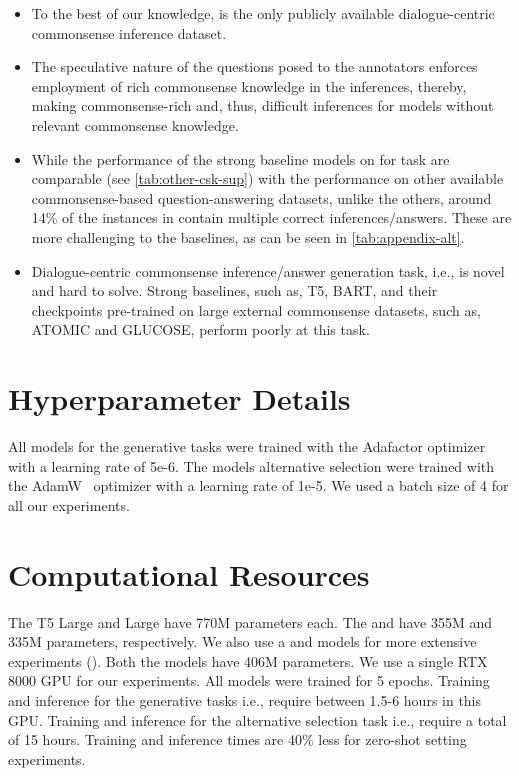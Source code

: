 \begin{itemize}
    \item To the best of our knowledge, \dataset{} is the only publicly available dialogue-centric commonsense inference dataset.
    \item The speculative nature of the questions posed to the annotators enforces employment of rich commonsense knowledge in the inferences, thereby, making \dataset{} commonsense-rich and, thus, difficult inferences for models without relevant commonsense knowledge.
    \item While the performance of the strong baseline models on \dataset{} for \dataset{} task are comparable (see \cref{tab:other-csk-sup}) with the performance on other available commonsense-based question-answering datasets, unlike the others, around 14\% of the instances in \dataset{} contain multiple correct inferences/answers. These are more challenging to the baselines, as can be seen in \cref{tab:appendix-alt}.
    \item Dialogue-centric commonsense inference/answer generation task, i.e., \dataset{} is novel and hard to solve. Strong baselines, such as, T5, BART, and their checkpoints pre-trained on large external commonsense datasets, such as, ATOMIC and GLUCOSE, perform poorly at this task.
\end{itemize}

\section{Hyperparameter Details}
All models for the \dataset{} generative tasks were trained with the Adafactor optimizer~\cite{shazeer2018adafactor} with a learning rate of 5e-6. The models  \dataset{} alternative selection were trained with the AdamW~\cite{loshchilov2018decoupled} optimizer with a learning rate of 1e-5. We used a batch size of 4 for all our experiments.

\section{Computational Resources}
The T5 Large and  Large have 770M parameters each. The  and  have 355M and 335M parameters, respectively. We also use a  and  models for more extensive experiments (). Both the models have 406M parameters. We use a single RTX 8000 GPU for our experiments. All models were trained for 5 epochs. Training and inference for the generative tasks i.e., \dataset{} require between 1.5-6 hours in this GPU. Training and inference for the alternative selection task i.e., \dataset{} require a total of 15 hours. Training and inference times are 40\% less for zero-shot setting experiments. 
